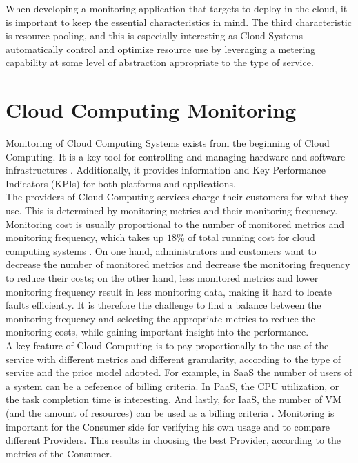 \noindent
When developing a monitoring application that targets to deploy in the cloud, it is important to keep the essential characteristics in mind. The third characteristic is resource pooling, and this is especially interesting as Cloud Systems automatically control and optimize resource use by leveraging a metering capability at some level of abstraction appropriate to the type of service.

\section{Cloud Computing Monitoring} \label{sec:intro_monitoring}
Monitoring of Cloud Computing Systems exists from the beginning of Cloud Computing. It is a key tool for controlling and managing hardware and software infrastructures \cite{aceto2013cloud}. Additionally, it provides information and Key Performance Indicators (KPIs) for both platforms and applications.\\

\noindent
The providers of Cloud Computing services charge their customers for what they use. This is determined by monitoring metrics and their monitoring frequency. Monitoring cost is usually proportional to the number of monitored metrics and monitoring frequency, which takes up $18\%$ of total running cost for cloud computing systems \cite{wang2018self}. On one hand, administrators and customers want to decrease the number of monitored metrics and decrease the monitoring frequency to reduce their costs; on the other hand, less monitored metrics and lower monitoring frequency result in less monitoring data, making it hard to locate faults efficiently. It is therefore the challenge to find a balance between the monitoring frequency and selecting the appropriate metrics to reduce the monitoring costs, while gaining important insight into the performance.\\

\noindent
A key feature of Cloud Computing is to pay proportionally to the use of the service with different metrics and different granularity, according to the type of service and the price model adopted. For example, in SaaS the number of users of a system can be a reference of billing criteria. In PaaS, the CPU utilization, or the task completion time is interesting. And lastly, for IaaS, the number of VM (and the amount of resources) can be used as a billing criteria \cite{katsaros2011building}. Monitoring is important for the Consumer side for verifying his own usage and to compare different Providers. This results in choosing the best Provider, according to the metrics of the Consumer.\\


